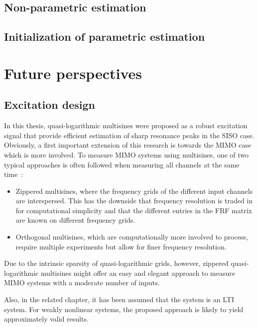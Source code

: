   \subsection{Non-parametric estimation}
  \subsection{Initialization of parametric estimation}


\section{Future perspectives}
  \subsection{Excitation design}
  In this thesis, quasi-logarithmic multisines were proposed as a robust excitation signal that provide efficient estimation of sharp resonance peaks in the \gls{SISO} case.
  Obviously, a first important extension of this research is towards the \gls{MIMO} case which is more involved.
  To measure \gls{MIMO} systems using multisines, one of two typical approaches is often followed when measuring all channels at the same time~\citep[Section 2.7]{Pintelon2012}:
  \begin{itemize}
    \item Zippered multisines, where the frequency grids of the different input channels are interspersed. This has the downside that frequency resolution is traded in for computational simplicity and that the different entries in the \gls{FRF} matrix are known on different frequency grids.
    \item Orthogonal multisines, which are computationally more involved to process, require multiple experiments but allow for finer frequency resolution.
  \end{itemize}
  Due to the intrinsic sparsity of quasi-logarithmic grids, however, zippered quasi-logarithmic multisines might offer an easy and elegant  approach to measure \gls{MIMO} systems with a moderate number of inputs.

  Also, in the related chapter, it has been assumed that the system is an \gls{LTI} system.
  For weakly nonlinear systems, the proposed approach is likely to yield approximately valid results.

